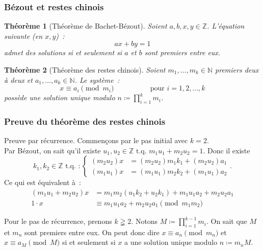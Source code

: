 \documentclass[10pt, mathserif]{beamer}
\newcommand{\tq}{\text{ t.q. }}
\newcommand{\Z}{\mathbb Z}
\newcommand{\N}{\mathbb N}
\newtheorem{thm}{Théorème}[section]
\theoremstyle{definition}
\theoremstyle{remark}
\begin{document}
	\begin{frame}
		\frametitle{Bézout et restes chinois}
		\begin{thm}[Théorème de Bachet-Bézout]
			Soient $a, b, x, y \in \Z$. L'équation suivante (en $x, y$)~: \[ax + by = 1\]
			admet des solutions si et seulement si $a$ et $b$ sont premiers entre eux.
		\end{thm}

		\begin{thm}[Théorème des restes chinois]
			Soient $m_1, \dotsc, m_k \in \N$ premiers deux à deux et $a_1, \dotsc, a_k \in \N$. Le système~:
			\[x \equiv a_i \pmod {m_i}\hspace{2cm}\text{ pour } i = 1, 2,  \dotsc, k\]
			possède une solution unique modulo $n \coloneqq \prod_{i=1}^km_i$.
		\end{thm}
	\end{frame}

	\begin{frame}
		\frametitle{Preuve du théorème des restes chinois}
		Preuve par récurrence. Commençons par le pas initial avec $k = 2$. \\
		Par Bézout, on sait qu'il existe $u_1, u_2 \in \Z \tq m_1u_1 + m_2u_2 = 1$. Donc il existe
		\[k_1, k_2 \in \Z \tq :\begin{cases}(m_2u_2)x &= (m_2u_2)m_1k_1 + (m_2u_2)a_1 \\ (m_1u_1)x &= (m_1u_1)m_2k_2 + (m_1u_1)a_2\end{cases}.\]
		Ce qui est équivalent à~:
		\[\begin{aligned}
			(m_1u_1 + m_2u_2)x &= m_1m_2(u_1k_2 + u_2k_1) + m_1u_1a_2 + m_2u_2a_1 \\
			1 \cdot x &\equiv m_1u_1a_2 + m_2u_2a_1 \pmod {m_1m_2}
		\end{aligned}\]
		
		Pour le pas de récurrence, prenons $k \gneqq 2$. Notons $M \coloneqq \prod_{i=1}^{k-1}m_i$. On sait que $M$ et $m_n$ sont premiers entre eux.
		On peut donc dire $x \equiv a_n \pmod {m_n}$ et $x \equiv a_M \pmod {M}$ si et seulement si $x$ a une solution unique modulo $n \coloneqq m_nM$.
	\end{frame}
\end{document}
